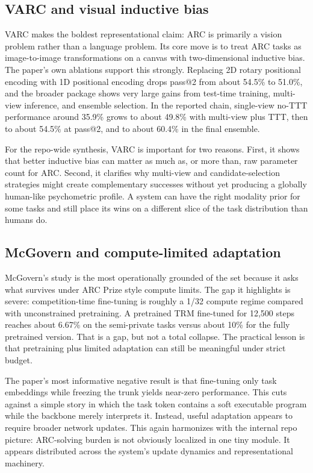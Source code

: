 \subsection{VARC and visual inductive bias}

VARC makes the boldest representational claim: ARC is primarily a vision problem rather than a language problem. Its core move is to treat ARC tasks as image-to-image transformations on a canvas with two-dimensional inductive bias. The paper's own ablations support this strongly. Replacing 2D rotary positional encoding with 1D positional encoding drops pass@2 from about 54.5\% to 51.0\%, and the broader package shows very large gains from test-time training, multi-view inference, and ensemble selection. In the reported chain, single-view no-TTT performance around 35.9\% grows to about 49.8\% with multi-view plus TTT, then to about 54.5\% at pass@2, and to about 60.4\% in the final ensemble.

For the repo-wide synthesis, VARC is important for two reasons. First, it shows that better inductive bias can matter as much as, or more than, raw parameter count for ARC. Second, it clarifies why multi-view and candidate-selection strategies might create complementary successes without yet producing a globally human-like psychometric profile. A system can have the right modality prior for some tasks and still place its wins on a different slice of the task distribution than humans do.

\subsection{McGovern and compute-limited adaptation}

McGovern's study is the most operationally grounded of the set because it asks what survives under ARC Prize style compute limits. The gap it highlights is severe: competition-time fine-tuning is roughly a 1/32 compute regime compared with unconstrained pretraining. A pretrained TRM fine-tuned for 12,500 steps reaches about 6.67\% on the semi-private tasks versus about 10\% for the fully pretrained version. That is a gap, but not a total collapse. The practical lesson is that pretraining plus limited adaptation can still be meaningful under strict budget.

The paper's most informative negative result is that fine-tuning only task embeddings while freezing the trunk yields near-zero performance. This cuts against a simple story in which the task token contains a soft executable program while the backbone merely interprets it. Instead, useful adaptation appears to require broader network updates. This again harmonizes with the internal repo picture: ARC-solving burden is not obviously localized in one tiny module. It appears distributed across the system's update dynamics and representational machinery.

